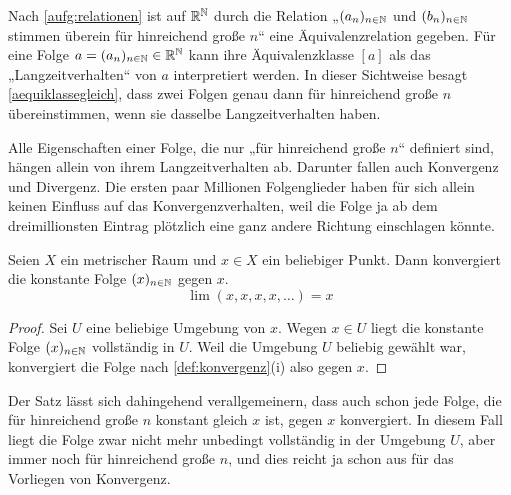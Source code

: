 \begin{bem}
    Nach \cref{aufg:relationen} ist auf $\mathbb R^\mathbb N$ durch die Relation „$(a_n)_{n\in \mathbb N}$ und $(b_n)_{n\in \mathbb N}$ stimmen überein für hinreichend große $n$“ eine Äquivalenzrelation gegeben. Für eine Folge $a=(a_n)_{n\in \mathbb N}\in \mathbb R^\mathbb N$ kann ihre Äquivalenzklasse $[a]$ als das „Langzeitverhalten“ von $a$ interpretiert werden. In dieser Sichtweise besagt \cref{aequiklassegleich}, dass zwei Folgen genau dann für hinreichend große $n$ übereinstimmen, wenn sie dasselbe Langzeitverhalten haben.

    Alle Eigenschaften einer Folge, die nur „für hinreichend große $n$“ definiert sind, hängen allein von ihrem Langzeitverhalten ab. Darunter fallen auch Konvergenz und Divergenz. Die ersten paar Millionen Folgenglieder haben für sich allein keinen Einfluss auf das Konvergenzverhalten, weil die Folge ja ab dem dreimillionsten Eintrag plötzlich eine ganz andere Richtung einschlagen könnte.
\end{bem}


\begin{bsp}
    Seien $X$ ein metrischer Raum und $x \in X$ ein beliebiger Punkt. Dann konvergiert die konstante Folge $(x)_{n\in \mathbb N}$ gegen $x$.
        \[ \lim(x,x,x,x,\dots)=x \]%
\end{bsp}
\begin{proof}
    Sei $U$ eine beliebige Umgebung von $x$. Wegen $x\in U$ liegt die konstante Folge $(x)_{n\in \mathbb N}$ vollständig in $U$. Weil die Umgebung $U$ beliebig gewählt war, konvergiert die Folge nach \cref{def:konvergenz}(i) also gegen $x$.
\end{proof}


\begin{bem}
    Der Satz lässt sich dahingehend verallgemeinern, dass auch schon jede Folge, die für hinreichend große $n$ konstant gleich $x$ ist, gegen $x$ konvergiert. In diesem Fall liegt die Folge zwar nicht mehr unbedingt vollständig in der Umgebung $U$, aber immer noch für hinreichend große $n$, und dies reicht ja schon aus für das Vorliegen von Konvergenz.
\end{bem}


